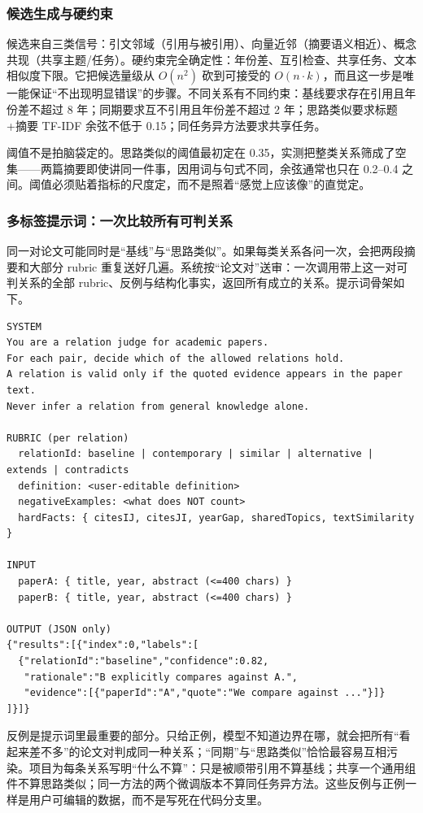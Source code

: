 \subsubsection{候选生成与硬约束}

候选来自三类信号：引文邻域（引用与被引用）、向量近邻（摘要语义相近）、概念共现（共享主题/任务）。硬约束完全确定性：年份差、互引检查、共享任务、文本相似度下限。它把候选量级从 $O(n^2)$ 砍到可接受的 $O(n\cdot k)$，而且这一步是唯一能保证“不出现明显错误”的步骤。不同关系有不同约束：基线要求存在引用且年份差不超过 8 年；同期要求互不引用且年份差不超过 2 年；思路类似要求标题+摘要 TF-IDF 余弦不低于 0.15；同任务异方法要求共享任务。

阈值不是拍脑袋定的。思路类似的阈值最初定在 0.35，实测把整类关系筛成了空集——两篇摘要即使讲同一件事，因用词与句式不同，余弦通常也只在 0.2--0.4 之间。阈值必须贴着指标的尺度定，而不是照着“感觉上应该像”的直觉定。

\subsubsection{多标签提示词：一次比较所有可判关系}

同一对论文可能同时是“基线”与“思路类似”。如果每类关系各问一次，会把两段摘要和大部分 rubric 重复送好几遍。系统按“论文对”送审：一次调用带上这一对可判关系的全部 rubric、反例与结构化事实，返回所有成立的关系。提示词骨架如下。

\begin{lstlisting}
SYSTEM
You are a relation judge for academic papers.
For each pair, decide which of the allowed relations hold.
A relation is valid only if the quoted evidence appears in the paper text.
Never infer a relation from general knowledge alone.

RUBRIC (per relation)
  relationId: baseline | contemporary | similar | alternative | extends | contradicts
  definition: <user-editable definition>
  negativeExamples: <what does NOT count>
  hardFacts: { citesIJ, citesJI, yearGap, sharedTopics, textSimilarity }

INPUT
  paperA: { title, year, abstract (<=400 chars) }
  paperB: { title, year, abstract (<=400 chars) }

OUTPUT (JSON only)
{"results":[{"index":0,"labels":[
  {"relationId":"baseline","confidence":0.82,
   "rationale":"B explicitly compares against A.",
   "evidence":[{"paperId":"A","quote":"We compare against ..."}]}
]}]}
\end{lstlisting}

反例是提示词里最重要的部分。只给正例，模型不知道边界在哪，就会把所有“看起来差不多”的论文对判成同一种关系；“同期”与“思路类似”恰恰最容易互相污染。项目为每条关系写明“什么不算”：只是被顺带引用不算基线；共享一个通用组件不算思路类似；同一方法的两个微调版本不算同任务异方法。这些反例与正例一样是用户可编辑的数据，而不是写死在代码分支里。

